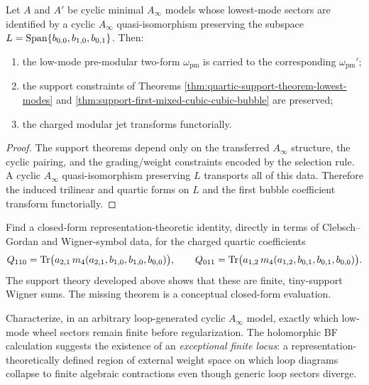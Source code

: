 \begin{proposition}
Let $A$ and $A'$ be cyclic minimal $A_\infty$ models whose lowest-mode sectors are identified
by a cyclic $A_\infty$ quasi-isomorphism preserving the subspace
$L=\operatorname{Span}\{b_{0,0},b_{1,0},b_{0,1}\}$. Then:
\begin{enumerate}[label=\textup{(\roman*)}]
\item the low-mode pre-modular two-form $\omega_{\mathrm{pm}}$ is carried to the corresponding
$\omega_{\mathrm{pm}}'$;
\item the support constraints of Theorems
\ref{thm:quartic-support-theorem-lowest-modes} and
\ref{thm:support-first-mixed-cubic-cubic-bubble} are preserved;
\item the charged modular jet transforms functorially.
\end{enumerate}
\end{proposition}

\begin{proof}
The support theorems depend only on the transferred $A_\infty$ structure, the cyclic pairing,
and the grading/weight constraints encoded by the selection rule. A cyclic
$A_\infty$ quasi-isomorphism preserving $L$ transports all of this data. Therefore the induced
trilinear and quartic forms on $L$ and the first bubble coefficient transform functorially.
\end{proof}

\begin{problem}
Find a closed-form representation-theoretic identity, directly in terms of Clebsch--Gordan and
Wigner-symbol data, for the charged quartic coefficients
\[
Q_{110}=\operatorname{Tr}\bigl(a_{2,1}\,m_4(a_{2,1},b_{1,0},b_{1,0},b_{0,0})\bigr),
\qquad
Q_{011}=\operatorname{Tr}\bigl(a_{1,2}\,m_4(a_{1,2},b_{0,1},b_{0,1},b_{0,0})\bigr).
\]
The support theory developed above shows that these are finite, tiny-support Wigner sums.
The missing theorem is a conceptual closed-form evaluation.
\end{problem}

\begin{problem}
Characterize, in an arbitrary loop-generated cyclic $A_\infty$ model, exactly which low-mode
wheel sectors remain finite before regularization. The holomorphic BF calculation suggests the
existence of an \emph{exceptional finite locus}: a representation-theoretically defined region of
external weight space on which loop diagrams collapse to finite algebraic contractions even
though generic loop sectors diverge.
\end{problem}

